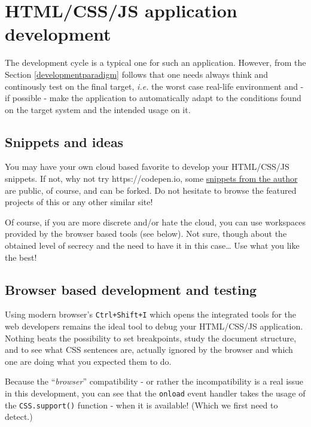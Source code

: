 \documentclass[11pt]{article}
\begin{document}
    \hypertarget{htmlcssjs-application-development}{%
\section{HTML/CSS/JS application
development}\label{htmlcssjs-application-development}}

    The development cycle is a typical one for such an application. However,
from the Section \ref{developmentparadigm} follows that one needs always
think and continously test on the final target, \emph{i.e.} the worst
case real-life environment and - if possible - make the application to
automatically adapt to the conditions found on the target system and the
intended usage on it.

    \hypertarget{snippets-and-ideas}{%
\subsection{Snippets and ideas}\label{snippets-and-ideas}}

    You may have your own cloud based favorite to develop your HTML/CSS/JS
snippets. If not, why not try https://codepen.io, some
\href{https://codepen.io/petrim}{snippets from the author} are public,
of course, and can be forked. Do not hesitate to browse the featured
projects of this or any other similar site!

    Of course, if you are more discrete and/or hate the cloud, you can use
workspaces provided by the browser based tools (see below). Not sure,
though about the obtained level of secrecy and the need to have it in
this case\ldots{} Use what you like the best!

    \hypertarget{browser-based-development-and-testing}{%
\subsection{Browser based development and
testing}\label{browser-based-development-and-testing}}

    Using modern browser's \texttt{Ctrl+Shift+I} which opens the integrated
tools for the web developers remains the ideal tool to debug your
HTML/CSS/JS application. Nothing beats the possibility to set
breakpoints, study the document structure, and to see what CSS sentences
are, actually ignored by the browser and which one are doing what you
expected them to do.

    Because the ``\emph{browser}'' compatibility - or rather the
incompatibility is a real issue in this development, you can see that
the \texttt{onload} event handler takes the usage of the
\texttt{CSS.support()} function - when it is available! (Which we first
need to detect.)
\end{document}
